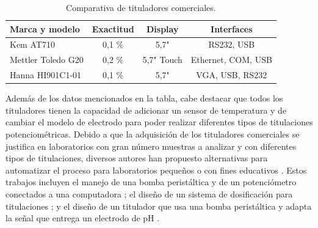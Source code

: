 \begin{table}[h]
	\centering
	\caption[Comparativa de tituladores comerciales.]{Comparativa de tituladores comerciales.}
	\begin{tabular}{l c c c }    
		\toprule
		\textbf{Marca y modelo} & \textbf{Exactitud}	&    \textbf{Display }&\textbf{Interfaces}  \\
		\midrule
		Kem AT710 		 	& 0,1 \% & 5,7" 		& RS232, USB \\		
		Mettler Toledo G20	& 0,2 \% & 5,7"  Touch	& Ethernet, COM, USB \\
		Hanna HI901C1-01	 	& 0,1 \% & 5,7"		& VGA, USB, RS232 \\
		\bottomrule
		\hline
	\end{tabular}
	\label{tab:titComerciales}
\end{table}

Además de los datos mencionados en la tabla, cabe destacar que todos los tituladores tienen la capacidad de adicionar un sensor de temperatura y de cambiar el modelo de electrodo para poder realizar diferentes tipos de titulaciones potenciométricas.
Debido a que la adquisición de los tituladores comerciales se justifica en laboratorios con gran número muestras a analizar y con diferentes tipos de titulaciones, diversos autores han propuesto  alternativas para automatizar el proceso para laboratorios pequeños o con fines educativos \citep{ARTICLE:1}\citep{ARTICLE:2}\citep{ARTICLE:3}.
Estos trabajos incluyen el manejo de una bomba peristáltica y de un potenciómetro conectados a una computadora \citep{ARTICLE:1}; el diseño de un sistema de dosificación para titulaciones \citep{ARTICLE:2}; y el diseño de un titulador que usa una bomba peristáltica y adapta la señal que entrega un electrodo de pH \citep{ARTICLE:3}.

